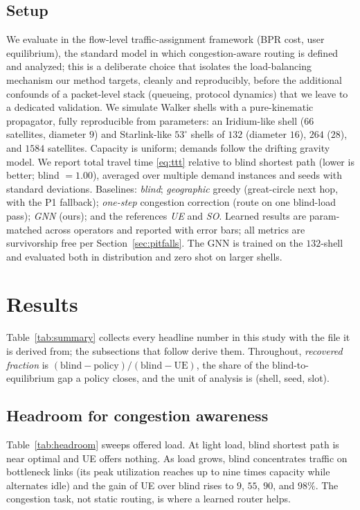 \documentclass[journal]{IEEEtran}
\begin{document}
\subsection{Setup}
We evaluate in the flow-level traffic-assignment framework (BPR cost, user equilibrium),
the standard model in which congestion-aware routing is defined and analyzed; this is a
deliberate choice that isolates the load-balancing mechanism our method targets, cleanly
and reproducibly, before the additional confounds of a packet-level stack (queueing,
protocol dynamics) that we leave to a dedicated validation. We simulate Walker shells with
a pure-kinematic propagator, fully reproducible from parameters: an Iridium-like shell
($66$ satellites, diameter $9$) and Starlink-like $53^\circ$ shells of $132$ (diameter
$16$), $264$ ($28$), and $1584$ satellites. Capacity is uniform; demands follow the
drifting gravity model. We
report total travel time \eqref{eq:ttt} relative to blind shortest path (lower is
better; blind $=1.00$), averaged over multiple demand instances and seeds with standard
deviations. Baselines: \emph{blind}; \emph{geographic} greedy (great-circle next hop,
with the P1 fallback); \emph{one-step} congestion correction (route on one blind-load
pass); \emph{GNN} (ours); and the references \emph{UE} and \emph{SO}. Learned results are
param-matched across operators and reported with error bars; all metrics are
survivorship free per Section~\ref{sec:pitfalls}. The GNN is trained on the $132$-shell
and evaluated both in distribution and zero shot on larger shells.

\section{Results}\label{sec:results}

Table~\ref{tab:summary} collects every headline number in this study with the file it is
derived from; the subsections that follow derive them. Throughout, \emph{recovered fraction}
is $(\mathrm{blind}-\mathrm{policy})/(\mathrm{blind}-\mathrm{UE})$, the share of the
blind-to-equilibrium gap a policy closes, and the unit of analysis is (shell, seed, slot).



\subsection{Headroom for congestion awareness}\label{sec:headroom}
Table~\ref{tab:headroom} sweeps offered load. At light load, blind shortest path is
near optimal and UE offers nothing. As load grows, blind concentrates traffic on
bottleneck links (its peak utilization reaches up to nine times capacity while
alternates idle) and the gain of UE over blind rises to $9$, $55$, $90$, and $98\%$.
The congestion task, not static routing, is where a learned router helps.
\end{document}
